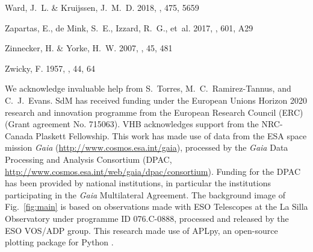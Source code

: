 \documentclass[a4paper,fleqn,usenatbib]{mnras}
\DeclareRobustCommand{\Figref}[1]{Fig.~\ref{#1}}
\begin{document}
\begin{thebibliography}{50}
{Ward}, J.~L. \& {Kruijssen}, J.~M.~D. 2018, \mnras, 475, 5659

{Zapartas}, E., {de Mink}, S.~E., {Izzard}, R.~G., {et~al.} 2017, \aap, 601,
  A29

{Zinnecker}, H. \& {Yorke}, H.~W. 2007, \araa, 45, 481

{Zwicky}, F. 1957, \zap, 44, 64
\end{thebibliography}


\small
We acknowledge invaluable help from S.~Torres, M.~C.~Ramirez-Tannus,
and C.~J.~Evans. SdM has received funding under the European Unions Horizon 2020 research and innovation programme from the European Research Council (ERC) (Grant agreement No. 715063). VHB acknowledges support from the NRC-Canada Plaskett Fellowship. This work has made use of data from the ESA space mission \emph{Gaia} (\url{http://www.cosmos.esa.int/gaia}), processed by the \emph{Gaia} Data Processing and Analysis Consortium (DPAC, \url{http://www.cosmos.esa.int/web/gaia/dpac/consortium}). Funding for the DPAC has been provided by national institutions, in particular the institutions participating in the \emph{Gaia} Multilateral Agreement. The background image of \Figref{fig:main} is based on observations
made with ESO Telescopes at the La Silla Observatory under programme
ID 076.C-0888, processed and released by the ESO VOS/ADP group.
This research made use of APLpy, an open-source plotting package for Python \citep[][]{robitaille:12}.

\bsp	%
\label{lastpage}
\end{document}
